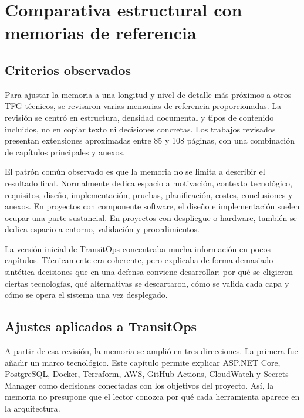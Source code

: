 \chapter{Comparativa estructural con memorias de referencia}
\label{chap:anexo-comparativa-referencias}

\section{Criterios observados}
\label{sec:criterios-observados}

Para ajustar la memoria a una longitud y nivel de detalle más próximos a otros TFG técnicos, se revisaron varias memorias de referencia proporcionadas. La revisión se centró en estructura, densidad documental y tipos de contenido incluidos, no en copiar texto ni decisiones concretas. Los trabajos revisados presentan extensiones aproximadas entre 85 y 108 páginas, con una combinación de capítulos principales y anexos.

El patrón común observado es que la memoria no se limita a describir el resultado final. Normalmente dedica espacio a motivación, contexto tecnológico, requisitos, diseño, implementación, pruebas, planificación, costes, conclusiones y anexos. En proyectos con componente software, el diseño e implementación suelen ocupar una parte sustancial. En proyectos con despliegue o hardware, también se dedica espacio a entorno, validación y procedimientos.

La versión inicial de TransitOps concentraba mucha información en pocos capítulos. Técnicamente era coherente, pero explicaba de forma demasiado sintética decisiones que en una defensa conviene desarrollar: por qué se eligieron ciertas tecnologías, qué alternativas se descartaron, cómo se valida cada capa y cómo se opera el sistema una vez desplegado.

\section{Ajustes aplicados a TransitOps}
\label{sec:ajustes-aplicados}

A partir de esa revisión, la memoria se amplió en tres direcciones. La primera fue añadir un marco tecnológico. Este capítulo permite explicar ASP.NET Core, PostgreSQL, Docker, Terraform, AWS, GitHub Actions, CloudWatch y Secrets Manager como decisiones conectadas con los objetivos del proyecto. Así, la memoria no presupone que el lector conozca por qué cada herramienta aparece en la arquitectura.

